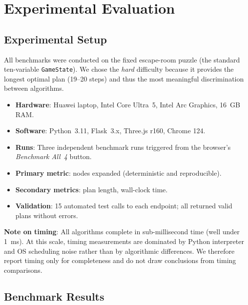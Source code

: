 \documentclass[12pt, a4paper]{report}
\begin{document}
\chapter{Experimental Evaluation}
\label{chap:evaluation}

\section{Experimental Setup}

All benchmarks were conducted on the fixed escape-room puzzle (the standard
ten-variable \texttt{GameState}).  We chose the \textit{hard} difficulty
because it provides the longest optimal plan (19--20 steps) and thus the most
meaningful discrimination between algorithms.

\begin{itemize}[leftmargin=1.5em]
  \item \textbf{Hardware}: Huawei laptop, Intel Core Ultra~5, Intel Arc Graphics, 16~GB RAM.
  \item \textbf{Software}: Python~3.11, Flask~3.x, Three.js r160, Chrome 124.
  \item \textbf{Runs}: Three independent benchmark runs triggered from the
        browser's \textit{Benchmark All~4} button.
  \item \textbf{Primary metric}: nodes expanded (deterministic and
        reproducible).
  \item \textbf{Secondary metrics}: plan length, wall-clock time.
  \item \textbf{Validation}: 15 automated test calls to each endpoint; all
        returned valid plans without errors.
\end{itemize}

\textbf{Note on timing}: All algorithms complete in sub-millisecond time (well
under 1~ms).  At this scale, timing measurements are dominated by Python
interpreter and OS scheduling noise rather than by algorithmic differences.
We therefore report timing only for completeness and do not draw conclusions
from timing comparisons.

\section{Benchmark Results}
\label{sec:benchresults}
\end{document}
